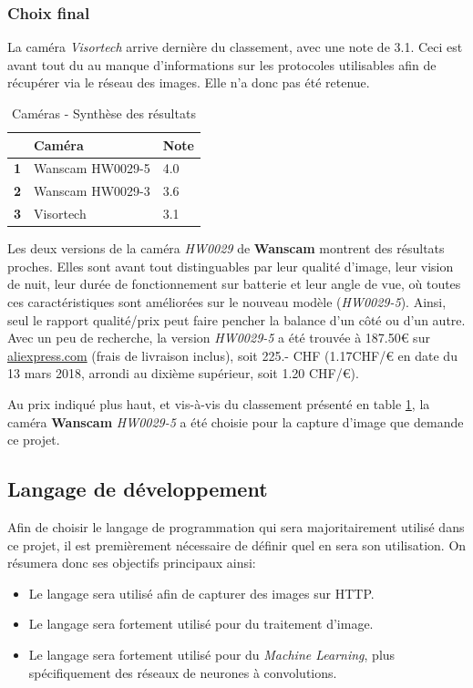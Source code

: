 \subsubsection{Choix final}

La caméra \textit{Visortech} arrive dernière du classement, avec une note de 3.1. Ceci est avant tout du au manque d'informations sur les protocoles utilisables afin de récupérer via le réseau des images. Elle n'a donc pas été retenue.

\begin{table}[!ht]
    \centering
    \caption{Caméras - Synthèse des résultats}
    \label{cam:synthese}
    \begin{tabular}{@{}lll@{}}
    \toprule
      & Caméra           & Note \\ \midrule
    \textbf{1} & Wanscam HW0029-5 & 4.0  \\
    \textbf{2} & Wanscam HW0029-3 & 3.6  \\
    \textbf{3} & Visortech        & 3.1  \\ \bottomrule
    \end{tabular}
\end{table}

Les deux versions de la caméra \textit{HW0029} de \textbf{Wanscam} montrent des résultats proches. Elles sont avant tout distinguables par leur qualité d'image, leur vision de nuit, leur durée de fonctionnement sur batterie et leur angle de vue, où toutes ces caractéristiques sont améliorées sur le nouveau modèle (\textit{HW0029-5}). Ainsi, seul le rapport qualité/prix peut faire pencher la balance d'un côté ou d'un autre. Avec un peu de recherche, la version \textit{HW0029-5} a été trouvée à 187.50€ sur \url{aliexpress.com}\autocite{cam:wan5-buy} (frais de livraison inclus), soit 225.- CHF (1.17CHF/€ en date du 13 mars 2018\autocite{util:cours}, arrondi au dixième supérieur, soit 1.20 CHF/€). 

Au prix indiqué plus haut, et vis-à-vis du classement présenté en table \ref{cam:synthese}, la caméra \textbf{Wanscam} \textit{HW0029-5} a été choisie pour la capture d'image que demande ce projet.

\subsection{Langage de développement}
Afin de choisir le langage de programmation qui sera majoritairement utilisé dans ce projet, il est premièrement nécessaire de définir quel en sera son utilisation. On résumera donc ses objectifs principaux ainsi:
\begin{itemize}
    \item Le langage sera utilisé afin de capturer des images sur HTTP.
    \item Le langage sera fortement utilisé pour du traitement d'image.
    \item Le langage sera fortement utilisé pour du \textit{Machine Learning}, plus spécifiquement des réseaux de neurones à convolutions.
\end{itemize}

